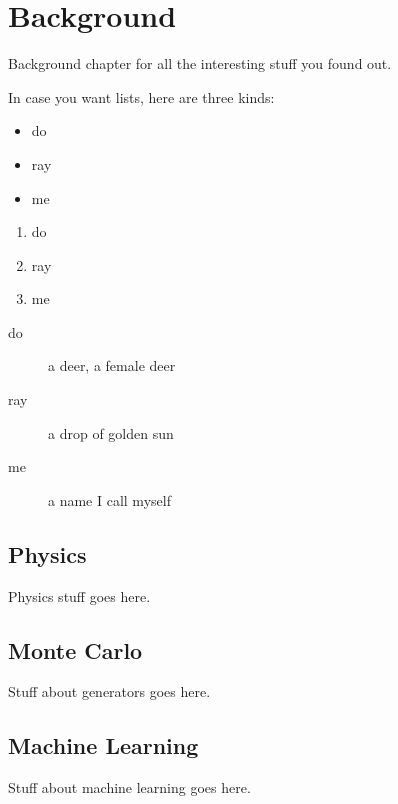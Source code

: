 \chapter{Background}

Background chapter for all the interesting stuff you found out.

In case you want lists, here are three kinds:


\begin{itemize}
\item do
\item ray
\item me
\end{itemize}

\begin{enumerate}
\item do
\item ray
\item me
\end{enumerate}

\begin{description}
\item[do]{ a deer, a female deer}
\item[ray]{ a drop of golden sun}
\item[me]{ a name I call myself}
\end{description}

\section{Physics}
Physics stuff goes here.

\section{Monte Carlo}
Stuff about generators goes here.

\section{Machine Learning}
Stuff about machine learning goes here.